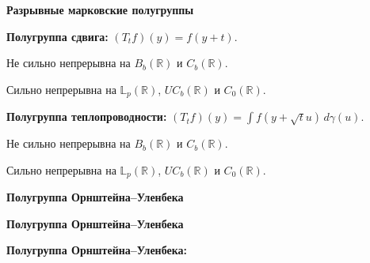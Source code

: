 \documentclass[11pt]{article}
\newcommand{\R}{\mathbb{R}}
\newcommand{\Lp}{\mathbb{L}}
\begin{document}
\newpage

\begin{center}
{\color{notaeYELLOW}\bfseries\fontsize{44}{52}\selectfont Разрывные марковские полугруппы}
\end{center}
\vspace*{\fill}
\begin{center}
\fontsize{36}{43}\selectfont
\parbox{\linewidth}{\centering\noindent \textbf{Полугруппа сдвига:} $(T_t f)(y)=f(y+t)$.
\par}\vspace{0.4in}
\parbox{\linewidth}{\centering\noindent Не сильно непрерывна на $B_b(\R)$ и $C_b(\R)$.
\par}\vspace{0.4in}
\parbox{\linewidth}{\centering\noindent Сильно непрерывна на $\Lp_p(\R)$, $UC_b(\R)$ и $C_0(\R)$.
\par}\vspace{0.4in}
\parbox{\linewidth}{\centering\noindent \textbf{Полугруппа теплопроводности:} $(T_t f)(y)=\int f(y+\sqrt{t}u)\,d\gamma(u)$.
\par}\vspace{0.4in}
\parbox{\linewidth}{\centering\noindent Не сильно непрерывна на $B_b(\R)$ и $C_b(\R)$.
\par}\vspace{0.4in}
\parbox{\linewidth}{\centering\noindent Сильно непрерывна на $\Lp_p(\R)$, $UC_b(\R)$ и $C_0(\R)$.
\par}\vspace{0.4in}
\end{center}
\vspace*{\fill}

\newpage

\begin{center}
{\color{notaeYELLOW}\bfseries\fontsize{44}{52}\selectfont Полугруппа Орнштейна--Уленбека}
\end{center}
\vspace*{\fill}
\begin{center}
\fontsize{36}{43}\selectfont
\end{center}
\vspace*{\fill}

\newpage

\begin{center}
{\color{notaeYELLOW}\bfseries\fontsize{44}{52}\selectfont Полугруппа Орнштейна--Уленбека}
\end{center}
\vspace*{\fill}
\begin{center}
\fontsize{36}{43}\selectfont
\parbox{\linewidth}{\centering\noindent \textbf{Полугруппа Орнштейна--Уленбека:}
\par}\vspace{0.4in}
\end{center}
\vspace*{\fill}
\end{document}
